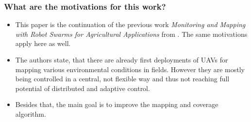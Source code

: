      
    \subsubsection*{What are the motivations for this work?}
    \begin{itemize}
        \item This paper is the continuation of the previous work \emph{Monitoring  and  Mapping with  Robot  Swarms  for  Agricultural  Applications} from \cite{Albani2017}. The same motivations apply here as well.
        \item The authors state, that there are already first deployments of UAVs for mapping various environmental conditions in fields. However they are mostly being controlled in a central, not flexible way and thus not reaching full potential of distributed and adaptive control.
        \item Besides that, the main goal is to improve the mapping and coverage algorithm.
    \end{itemize}
